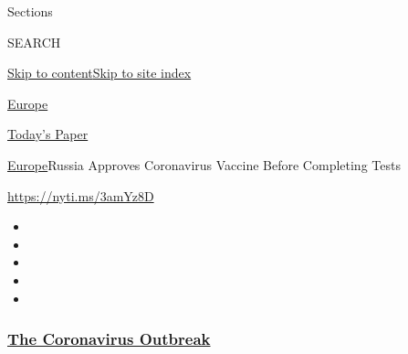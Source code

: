 Sections

SEARCH

\protect\hyperlink{site-content}{Skip to
content}\protect\hyperlink{site-index}{Skip to site index}

\href{https://www.nytimes3xbfgragh.onion/section/world/europe}{Europe}

\href{https://myaccount.nytimes3xbfgragh.onion/auth/login?response_type=cookie\&client_id=vi}{}

\href{https://www.nytimes3xbfgragh.onion/section/todayspaper}{Today's
Paper}

\href{/section/world/europe}{Europe}\textbar{}Russia Approves
Coronavirus Vaccine Before Completing Tests

\url{https://nyti.ms/3amYz8D}

\begin{itemize}
\item
\item
\item
\item
\item
\end{itemize}

\hypertarget{the-coronavirus-outbreak}{%
\subsubsection{\texorpdfstring{\href{https://www.nytimes3xbfgragh.onion/news-event/coronavirus?name=styln-coronavirus-national\&region=TOP_BANNER\&block=storyline_menu_recirc\&action=click\&pgtype=Article\&impression_id=aa23ca20-efb6-11ea-bbc0-9feac4622442\&variant=undefined}{The
Coronavirus
Outbreak}}{The Coronavirus Outbreak}}\label{the-coronavirus-outbreak}}


